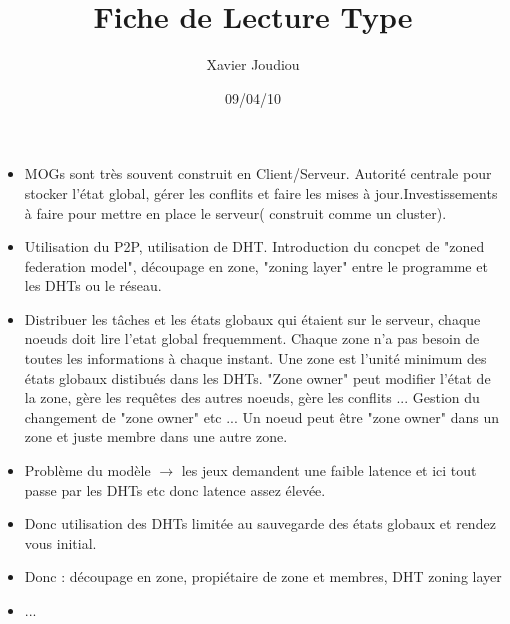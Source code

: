 \documentclass[11pt,a4paper]{article}
\title{Fiche de Lecture Type}
\author{Xavier Joudiou}
\date{09/04/10}
\begin{document}
	
  \begin{itemize}
  \renewcommand{\labelitemi}{$\Rightarrow$}
	\item MOGs sont très souvent construit en Client/Serveur. Autorité centrale pour stocker l'état global, gérer les conflits et faire les mises à jour.Investissements à faire pour mettre en place le serveur( construit comme un cluster).
	\item Utilisation du P2P, utilisation de DHT. Introduction du concpet de "zoned federation model", découpage en zone, "zoning layer" entre le programme et les DHTs ou le réseau. 
	\item Distribuer les tâches et les états globaux qui étaient sur le serveur, chaque noeuds doit lire l'etat global frequemment. Chaque zone n'a pas besoin de toutes les informations à chaque instant. Une zone est l'unité minimum des états globaux distibués dans les DHTs. "Zone owner" peut modifier l'état de la zone, gère les requêtes des autres noeuds, gère les conflits ... Gestion du changement de "zone owner" etc ... Un noeud peut être "zone owner" dans un zone et juste membre dans une autre zone.
	\item Problème du modèle $\rightarrow$ les jeux demandent une faible latence et ici tout passe par les DHTs etc donc latence assez élevée.
	\item Donc utilisation des DHTs limitée au sauvegarde des états globaux et rendez vous initial.
	\item Donc : découpage en zone, propiétaire de zone et membres, DHT zoning layer
	\item ...
  \end{itemize}
\end{document}
